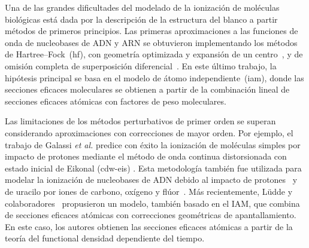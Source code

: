 Una de las grandes dificultades del modelado de la ionización de 
moléculas biológicas está dada por la descripción de la estructura del 
blanco a partir métodos de primeros principios. Las primeras 
aproximaciones a las funciones de onda de nucleobases de ADN y ARN se 
obtuvieron implementando los métodos de Hartree--Fock~(\acs{hf}), con 
geometría optimizada y expansión de un centro~\cite{DalCappello:08}, y 
de omisión completa de superposición diferencial~\cite{Champion:10}. En 
este último trabajo, la hipótesis principal se basa en el modelo de 
átomo independiente~(\acs{iam}), donde las secciones eficaces 
moleculares se obtienen a partir de la combinación lineal de secciones 
eficaces atómicas con factores de peso moleculares. 

Las limitaciones de los métodos perturbativos de primer orden se superan 
considerando aproximaciones con correcciones de mayor orden. 
Por ejemplo, el trabajo de Galassi \textit{et al.} \cite{Galassi:00} 
predice con éxito la ionización de moléculas simples por impacto de 
protones mediante el método de onda continua distorsionada con estado 
inicial de Eikonal (\acs{cdw-eis}) \cite{Fainstein:88,Miraglia:08,
Miraglia:09}. Esta metodología también fue utilizada para modelar 
la ionización de nucleobases de ADN debido al impacto de 
protones~\cite{Galassi:12} y de uracilo por iones de carbono, oxígeno y 
flúor~\cite{champion2012,agnihotri2012,agnihotri2013}.
Más recientemente, L\"udde y colaboradores~\cite{Ludde:16,Ludde:18,
Ludde:19,Ludde:20} propusieron un modelo, también basado en el IAM, que 
combina de secciones eficaces atómicas con correcciones geométricas de 
apantallamiento. En este caso, los autores obtienen las secciones 
eficaces atómicas a partir de la teoría del functional densidad 
dependiente del tiempo. 

